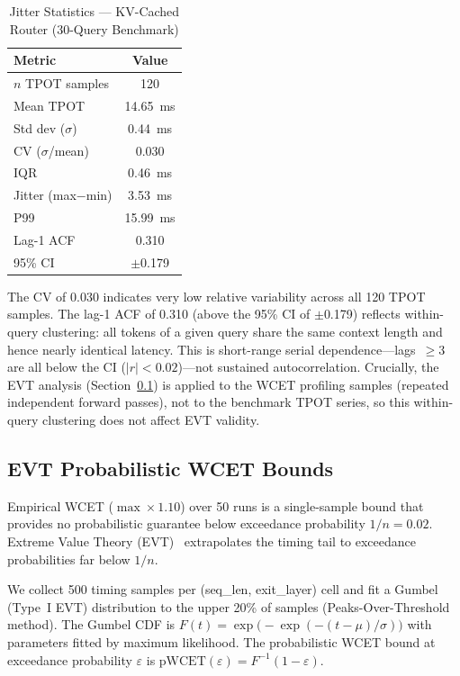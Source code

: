 \documentclass[conference]{IEEEtran}
\begin{document}
\begin{table}[htbp]
\caption{Jitter Statistics --- KV-Cached Router (30-Query Benchmark)}
\centering
\begin{tabular}{@{}lc@{}}
\toprule
\textbf{Metric} & \textbf{Value} \\
\midrule
$n$ TPOT samples           & 120 \\
Mean TPOT                  & 14.65~ms \\
Std dev ($\sigma$)         & 0.44~ms \\
CV ($\sigma$/mean)         & 0.030 \\
IQR                        & 0.46~ms \\
Jitter (max$-$min)         & 3.53~ms \\
P99                        & 15.99~ms \\
Lag-1 ACF                  & 0.310 \\
95\% CI                    & $\pm$0.179 \\
\bottomrule
\end{tabular}
\label{tab:jitter}
\end{table}

The CV of 0.030 indicates very low relative variability across all
120 TPOT samples.
The lag-1 ACF of 0.310 (above the 95\% CI of $\pm$0.179) reflects
within-query clustering: all tokens of a given query share
the same context length and hence nearly identical latency.
This is short-range serial dependence---lags~$\geq$3 are all below
the CI ($|r| < 0.02$)---not sustained autocorrelation.
Crucially, the EVT analysis (Section~\ref{sec:evt}) is applied to
the WCET profiling samples (repeated independent forward passes),
not to the benchmark TPOT series, so this within-query clustering
does not affect EVT validity.

\subsection{EVT Probabilistic WCET Bounds}
\label{sec:evt}

Empirical WCET ($\max \times 1.10$) over 50 runs is a single-sample
bound that provides no probabilistic guarantee below exceedance
probability $1/n = 0.02$.
Extreme Value Theory (EVT)~\cite{bernat2002wcet,coles2001introduction}
extrapolates the timing tail to exceedance probabilities far below $1/n$.

We collect 500 timing samples per (seq\_len, exit\_layer) cell and
fit a Gumbel (Type~I EVT) distribution to the upper 20\% of samples
(Peaks-Over-Threshold method).
The Gumbel CDF is
$F(t) = \exp\!\bigl(-\exp(-(t-\mu)/\sigma)\bigr)$
with parameters fitted by maximum likelihood.
The probabilistic WCET bound at exceedance probability $\varepsilon$ is
$\text{pWCET}(\varepsilon) = F^{-1}(1-\varepsilon)$.
\end{document}
